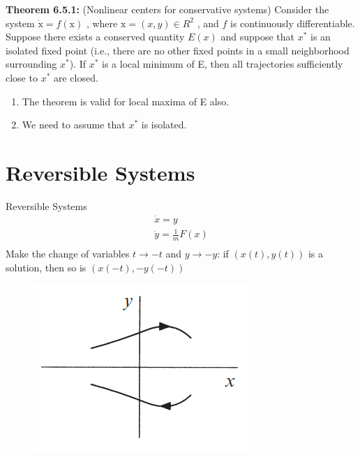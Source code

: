 \documentclass[9pt,aspectratio=43,mathserif,table]{beamer}
\begin{document}
\begin{frame}
	\textbf{Theorem 6.5.1:} (Nonlinear centers for conservative systems) Consider the 
	system $\dot{\mathrm{x}}=f(\mathrm{x})$ , where $\mathrm{x}=(x, y)\in R^2$
	, and $f$ is continuously differentiable. Suppose there exists a conserved quantity $E (x)$ and suppose that $x^*$ is an isolated fixed point (i.e., there are no other fixed points in a small neighborhood surrounding $x^*$). If $x^*$ is a local minimum of E, then all trajectories sufficiently close to $x^*$ are closed.
	$$\ $$

	\begin{enumerate}
		\item The theorem is valid for local maxima of E also.
		\item We need to assume that $x^*$ is isolated.
	\end{enumerate}
\end{frame}

\section{Reversible Systems}

\begin{frame}{Reversible Systems}
	$$
	\begin{array}{c}
		\dot{x}=y\\
		\dot{y}=\frac{1}{m}F\left( x \right)\\
	\end{array}
	$$
	$$\ $$
	Make the change of variables $t \rightarrow -t$ and $y \rightarrow -y$: if $(x(t), y(t))$ is a solution, then so is $(x(-t), -y(-t))$

	\begin{figure}
		\centering
		\includegraphics[width=0.4\linewidth]{fig661.jpg}
	\end{figure}

\end{frame}
\end{document}
